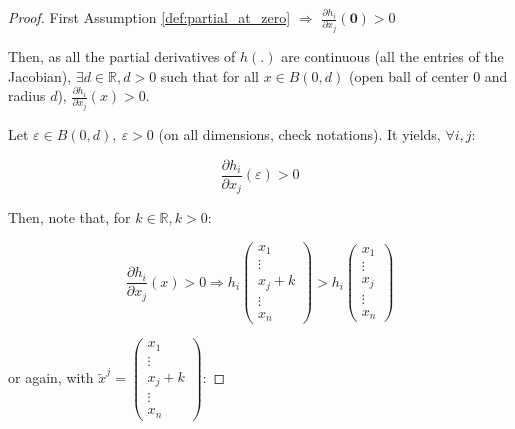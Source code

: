 \documentclass[12pt]{article}
\begin{document}
\begin{proof}
First Assumption  \ref{def:partial_at_zero} $\Rightarrow$ $\frac{\partial h_i}{\partial x_j}(\bm{0})>0$

Then, as all the partial derivatives of $h(.)$ are continuous (all the entries of the Jacobian),  $\exists d \in \mathbb{R}, d>0$ such that for all $x \in B(0,d)$ (open ball of center $0$ and radius $d$), $\frac{\partial h_i}{\partial x_j}(x)>0$. 

Let $\varepsilon \in B(0,d), \ \varepsilon >0$ (on all dimensions, check notations). It yields, $\forall i,j$:

\[ \frac{\partial h_i}{\partial x_j}(\varepsilon) >0 \]

Then, note that, for $k \in \mathbb{R}, k>0$:

\[ \frac{\partial h_i}{\partial x_j}(x) >0 \Rightarrow h_i \left( \begin{array}{c} x_1 \\ \vdots \\ x_j + k \\ \vdots \\ x_n \end{array} \right) > h_i \left( \begin{array}{c} x_1 \\ \vdots \\ x_j \\ \vdots \\ x_n \end{array} \right)  \]


or again, with $\tilde{x}^j = \left( \begin{array}{c} x_1 \\ \vdots \\ x_j + k \\ \vdots \\ x_n \end{array} \right) $:


\end{proof}
\end{document}
